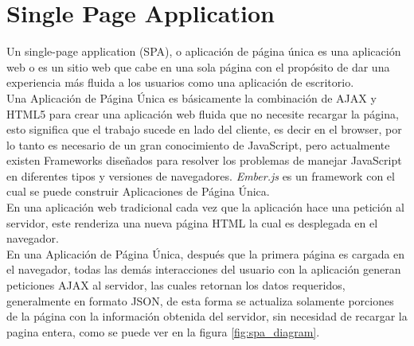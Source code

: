 
\section{Single Page Application}
\label{sec:Single Page App}

Un single-page application (SPA), o aplicación de página única es una aplicación web o es un sitio web que cabe en una sola página con el propósito de dar una experiencia más fluida a los usuarios como una aplicación de escritorio. \cite{spa_wiki}\\

Una Aplicación de Página Única es básicamente la combinación de AJAX y HTML5 para crear una aplicación web fluida que no necesite recargar la página, esto significa que el trabajo sucede en lado del cliente, es decir en el browser, por lo tanto es necesario de un gran conocimiento de JavaScript, pero actualmente existen Frameworks diseñados para resolver los problemas de manejar JavaScript en diferentes tipos y versiones de navegadores. \emph{Ember.js} es un framework con el cual se puede construir Aplicaciones de Página Única. \\





En una aplicación web tradicional cada vez que la aplicación hace una petición al servidor, este renderiza una nueva página HTML la cual es desplegada en el navegador.\\



En una Aplicación de Página Única, después que la primera página es cargada en el navegador, todas las demás interacciones del usuario con la aplicación generan peticiones AJAX al servidor, las cuales retornan los datos requeridos, generalmente en formato JSON, de esta forma se actualiza solamente porciones de la página con la información obtenida del servidor, sin necesidad de recargar la pagina entera, como se puede ver en la figura \ref{fig:spa_diagram}. \\


